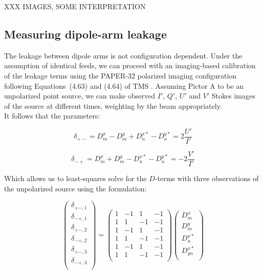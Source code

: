 XXX IMAGES, SOME INTERPRETATION 

\subsection{Measuring dipole-arm leakage}
\label{subsec:method_dterms}
The leakage between dipole arms is not configuration dependent. Under the assumption of identical feeds, we can proceed with an imaging-based calibration of the leakage terms using the PAPER-32 polarized imaging configuration following Equations~(4.63) and (4.64) of TMS \cite{TMS}. Assuming Pictor A to be an unpolarized point source, we can make observed $I'$, $Q'$, $U'$ and $V'$ Stokes images of the source at different times, weighting by the beam appropriately.  \\

It follows that the parameters:

\begin{equation}
\delta_{+-} = D^x_m - D^y_m + D^{x*}_n - D^{y*}_n = 2\frac{U'}{I'}
\end{equation}

\begin{equation}
\delta_{-+} = D^x_m + D^y_m - D^{x*}_n - D^{y*}_n = -2\frac{V'}{I'}
\end{equation}

\noindent Which allows us to least-squares solve for the $D$-terms with three observations of the unpolarized source using the formulation:

\begin{equation}
\begin{pmatrix}
\delta_{+-,1} \\
\delta_{-+,1} \\
\delta_{+-,2} \\
\delta_{-+,2} \\
\delta_{+-,3} \\
\delta_{-+,3} \\
\end{pmatrix}
=
\begin{pmatrix}
1 & -1 & 1 & -1 \\
1 & 1 & -1 & -1 \\
1 & -1 & 1 & -1 \\
1 & 1 & -1 & -1 \\
1 & -1 & 1 & -1 \\
1 & 1 & -1 & -1 \\
\end{pmatrix}
\begin{pmatrix}
D^x_{m}\\
D^y_{m}\\
D^{x*}_{n}\\
D^{x*}_{yn}\\
\end{pmatrix}
\label{eq:Dterms3times}
\end{equation}